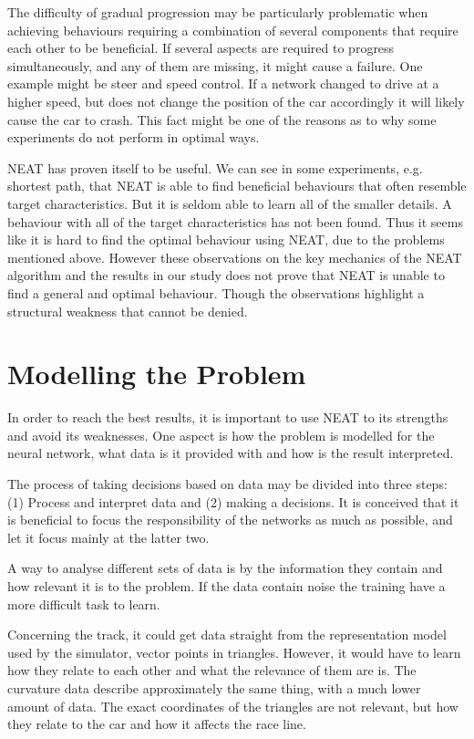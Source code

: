 The difficulty of gradual progression may be particularly problematic when achieving behaviours requiring a combination of several components that require each other to be beneficial. If several aspects are required to progress simultaneously, and any of them are missing, it might cause a failure. One example might be steer and speed control. If a network changed to drive at a higher speed, but does not change the position of the car accordingly it will likely cause the car to crash. This fact might be one of the reasons as to why some experiments do not perform in optimal ways.

NEAT has proven itself to be useful. We can see in some experiments, e.g. shortest path, that NEAT is able to find beneficial behaviours that often resemble target characteristics. But it is seldom able to learn all of the smaller details. A behaviour with all of the target characteristics has not been found. Thus it seems like it is hard to find the optimal behaviour using NEAT, due to the problems mentioned above. However these observations on the key mechanics of the NEAT algorithm and the results in our study does not prove that NEAT is unable to find a general and optimal behaviour. Though the observations highlight a structural weakness that cannot be denied. 

\section{Modelling the Problem}

In order to reach the best results, it is important to use NEAT to its strengths and avoid its weaknesses. One aspect is how the problem is modelled for the neural network, what data is it provided with and how is the result interpreted.

The process of taking decisions based on data may be divided into three steps: (1) Process and interpret data and (2) making a decisions. It is conceived that it is beneficial to focus the responsibility of the networks as much as possible, and let it focus mainly at the latter two. 


A way to analyse different sets of data is by the information they contain and how relevant it is to the problem. If the data contain noise the training have a more difficult task to learn.

Concerning the track, it could get data straight from the representation model used by the simulator, vector points in triangles. However, it would have to learn how they relate to each other and what the relevance of them are is. The curvature data describe approximately the same thing, with a much lower amount of data. The exact coordinates of the triangles are not relevant, but how they relate to the car and how it affects the race line. 

